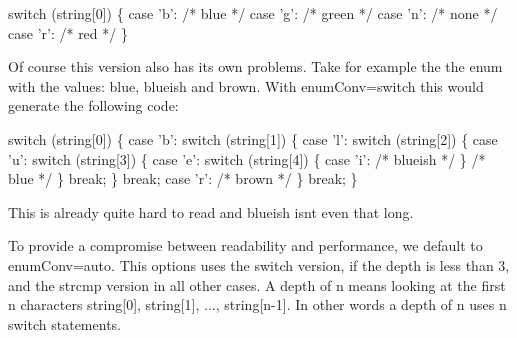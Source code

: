 \begin{DoxyCode}
\textcolor{keywordflow}{switch} (\textcolor{keywordtype}{string}[0])
\{
\textcolor{keywordflow}{case} \textcolor{charliteral}{'b'}: \textcolor{comment}{/* blue */}
\textcolor{keywordflow}{case} \textcolor{charliteral}{'g'}: \textcolor{comment}{/* green */}
\textcolor{keywordflow}{case} \textcolor{charliteral}{'n'}: \textcolor{comment}{/* none */}
\textcolor{keywordflow}{case} \textcolor{charliteral}{'r'}: \textcolor{comment}{/* red */}
\}
\end{DoxyCode}


Of course this version also has its own problems. Take for example the the enum with the values\+: {\ttfamily blue}, {\ttfamily blueish} and {\ttfamily brown}. With {\ttfamily enum\+Conv=switch} this would generate the following code\+:


\begin{DoxyCode}
\textcolor{keywordflow}{switch} (\textcolor{keywordtype}{string}[0])
\{
\textcolor{keywordflow}{case} \textcolor{charliteral}{'b'}:
    \textcolor{keywordflow}{switch} (\textcolor{keywordtype}{string}[1])
    \{
    \textcolor{keywordflow}{case} \textcolor{charliteral}{'l'}:
        \textcolor{keywordflow}{switch} (\textcolor{keywordtype}{string}[2])
        \{
        \textcolor{keywordflow}{case} \textcolor{charliteral}{'u'}:
            \textcolor{keywordflow}{switch} (\textcolor{keywordtype}{string}[3])
            \{
            \textcolor{keywordflow}{case} \textcolor{charliteral}{'e'}:
                \textcolor{keywordflow}{switch} (\textcolor{keywordtype}{string}[4])
                \{
                \textcolor{keywordflow}{case} \textcolor{charliteral}{'i'}: \textcolor{comment}{/* blueish */}
                \}
                \textcolor{comment}{/* blue */}
            \}
            \textcolor{keywordflow}{break};
        \}
        \textcolor{keywordflow}{break};
        \textcolor{keywordflow}{case} \textcolor{charliteral}{'r'}: \textcolor{comment}{/* brown */}
    \}
    \textcolor{keywordflow}{break};
\}
\end{DoxyCode}


This is already quite hard to read and {\ttfamily blueish} isn\textquotesingle{}t even that long.

To provide a compromise between readability and performance, we default to {\ttfamily enum\+Conv=auto}. This options uses the switch version, if the depth is less than 3, and the {\ttfamily strcmp} version in all other cases. A depth of {\ttfamily n} means looking at the first {\ttfamily n} characters {\ttfamily string\mbox{[}0\mbox{]}, string\mbox{[}1\mbox{]}, ..., string\mbox{[}n-\/1\mbox{]}}. In other words a depth of {\ttfamily n} uses {\ttfamily n} switch statements.

